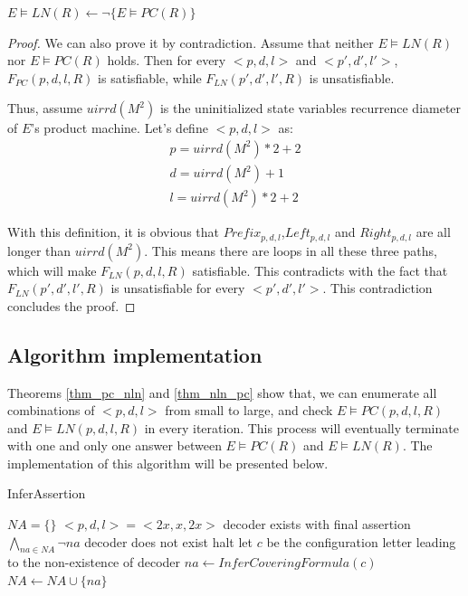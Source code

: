 \documentclass{acm_proc_article-sp}
\begin{document}
\begin{theorem}[]\label{thm_nln_pc}
$E\vDash LN(R)\gets \neg \{E\vDash PC(R)\}$
\end{theorem}
\begin{proof}
We can also prove it by contradiction.
Assume that neither $E\vDash LN(R)$ nor $E\vDash PC(R)$ holds.
Then for every $<p,d,l>$ and $<p',d',l'>$,
$F_{PC}(p,d,l,R)$ is satisfiable,
while $F_{LN}(p',d',l',R)$ is unsatisfiable.

Thus,
assume $uirrd(M^2)$ is the uninitialized state variables recurrence diameter of $E$'s product machine.
Let's define $<p,d,l>$ as:
\begin{equation}
\begin{array}{c}
p=uirrd(M^2)*2+2 \\
d=uirrd(M^2)+1 \\
l=uirrd(M^2)*2+2
\end{array}
\end{equation}

With this definition,
it is obvious that $Prefix_{p,d,l}$,$Left_{p,d,l}$ and $Right_{p,d,l}$ are all longer than $uirrd(M^2)$.
This means there are loops in all these three paths,
which will make $F_{LN}(p,d,l,R)$ satisfiable.
This contradicts with the fact that $F_{LN}(p',d',l',R)$ is unsatisfiable for every $<p',d',l'>$.
This contradiction concludes the proof.
\end{proof}


\subsection{Algorithm implementation}\label{subsec_algo}
Theorems \ref{thm_pc_nln} and \ref{thm_nln_pc} show that,
we can enumerate all combinations of $<p,d,l>$ from small to large,
and check $E\vDash PC(p,d,l,R)$ and $E\vDash LN(p,d,l,R)$ in every iteration.
This process will eventually terminate with one and only one answer between $E\vDash PC(R)$ and $E\vDash LN(R)$.
The implementation of this algorithm will be presented below.

\begin{algorithm}
\caption{InferAssertion}
\label{algo_pcln}
\begin{algorithmic}[1]
\STATE $NA=\{\}$
\STATE $<p,d,l>=<2x,x,2x>$
\STATE decoder exists with final assertion $\bigwedge_{na\in NA}\neg na$
\ELSE
\STATE decoder does not exist
\ENDIF
\STATE halt
\ELSE
{}
\STATE let $c$ be the configuration letter leading to the non-existence of decoder
\STATE $na\leftarrow InferCoveringFormula(c)$
\STATE $NA\leftarrow NA\cup \{na\}$
\ENDWHILE
\ENDIF
\ENDFOR
\end{algorithmic}
\end{algorithm}
\end{document}
